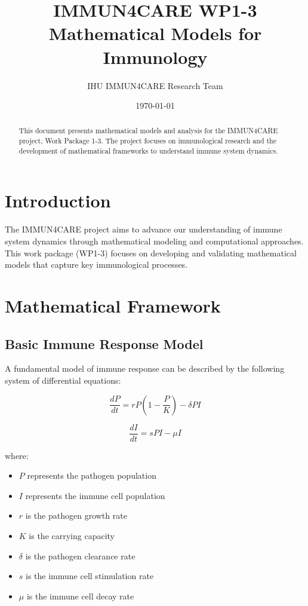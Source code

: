 \documentclass[12pt,a4paper]{article}
\title{IMMUN4CARE WP1-3\\Mathematical Models for Immunology}
\author{IHU IMMUN4CARE Research Team}
\date{\today}
\begin{document}
\maketitle

\begin{abstract}
This document presents mathematical models and analysis for the IMMUN4CARE project, Work Package 1-3. The project focuses on immunological research and the development of mathematical frameworks to understand immune system dynamics.
\end{abstract}

\section{Introduction}

The IMMUN4CARE project aims to advance our understanding of immune system dynamics through mathematical modeling and computational approaches. This work package (WP1-3) focuses on developing and validating mathematical models that capture key immunological processes.

\section{Mathematical Framework}

\subsection{Basic Immune Response Model}

A fundamental model of immune response can be described by the following system of differential equations:

\begin{equation}
\frac{dP}{dt} = r P \left(1 - \frac{P}{K}\right) - \delta P I
\end{equation}

\begin{equation}
\frac{dI}{dt} = s P I - \mu I
\end{equation}

where:
\begin{itemize}
    \item $P$ represents the pathogen population
    \item $I$ represents the immune cell population
    \item $r$ is the pathogen growth rate
    \item $K$ is the carrying capacity
    \item $\delta$ is the pathogen clearance rate
    \item $s$ is the immune cell stimulation rate
    \item $\mu$ is the immune cell decay rate
\end{itemize}
\end{document}
